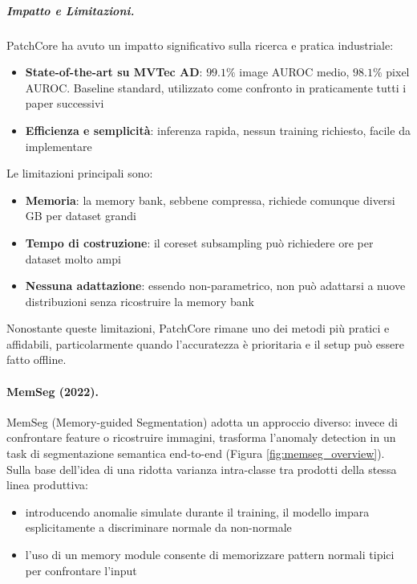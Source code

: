 \subparagraph{Impatto e Limitazioni.}

PatchCore ha avuto un impatto significativo sulla ricerca e pratica industriale:
\begin{itemize}
\item \textbf{State-of-the-art su MVTec AD}: $99.1\%$ image AUROC medio, $98.1\%$ pixel AUROC. Baseline standard, utilizzato come confronto in praticamente tutti i paper successivi
\item \textbf{Efficienza e semplicità}: inferenza rapida, nessun training richiesto, facile da implementare 
\end{itemize}

Le limitazioni principali sono:
\begin{itemize}
\item \textbf{Memoria}: la memory bank, sebbene compressa, richiede comunque diversi GB per dataset grandi
\item \textbf{Tempo di costruzione}: il coreset subsampling può richiedere ore per dataset molto ampi
\item \textbf{Nessuna adattazione}: essendo non-parametrico, non può adattarsi a nuove distribuzioni senza ricostruire la memory bank
\end{itemize}

Nonostante queste limitazioni, PatchCore rimane uno dei metodi più pratici e affidabili, particolarmente quando l'accuratezza è prioritaria e il setup può essere fatto offline.

\paragraph{MemSeg (2022).}

MemSeg (Memory-guided Segmentation) \cite{yang2022memseg} adotta un approccio diverso: invece di confrontare feature o ricostruire immagini, tras\-for\-ma l'anomaly detection in un task di segmentazione semantica end-to-end (Figura \ref{fig:memseg_overview}). Sulla base dell'idea di una ridotta varianza intra-classe tra prodotti della stessa linea produttiva:
\begin{itemize}
    \item introducendo anomalie simulate durante il training, il modello impara esplicitamente a discriminare normale da non-normale
    \item l'uso di un memory module consente di memorizzare pattern normali tipici per confrontare l'input
\end{itemize}

